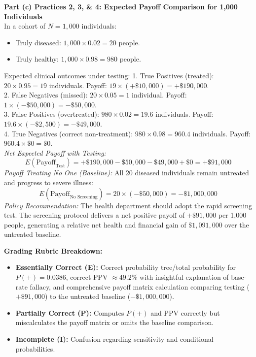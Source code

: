 \begin{frqrubricbox}
\textbf{Part (c) Practices 2, 3, \& 4: Expected Payoff Comparison for 1,000 Individuals}\\
In a cohort of $N = 1,000$ individuals:
\begin{itemize}
  \item Truly diseased: $1,000 \times 0.02 = 20$ people.
  \item Truly healthy: $1,000 \times 0.98 = 980$ people.
\end{itemize}
Expected clinical outcomes under testing:
1. True Positives (treated): $20 \times 0.95 = 19$ individuals. Payoff: $19 \times (+\$10,000) = +\$190,000$.\\
2. False Negatives (missed): $20 \times 0.05 = 1$ individual. Payoff: $1 \times (-\$50,000) = -\$50,000$.\\
3. False Positives (overtreated): $980 \times 0.02 = 19.6$ individuals. Payoff: $19.6 \times (-\$2,500) = -\$49,000$.\\
4. True Negatives (correct non-treatment): $980 \times 0.98 = 960.4$ individuals. Payoff: $960.4 \times \$0 = \$0$.\\
\textit{Net Expected Payoff with Testing:}
\[ E(\text{Payoff}_{\text{Test}}) = +\$190,000 - \$50,000 - \$49,000 + \$0 = +\$91,000 \]
\textit{Payoff Treating No One (Baseline):}
All 20 diseased individuals remain untreated and progress to severe illness:
\[ E(\text{Payoff}_{\text{No Screening}}) = 20 \times (-\$50,000) = -\$1,000,000 \]
\textit{Policy Recommendation:} The health department should adopt the rapid screening test. The screening protocol delivers a net positive payoff of $+\$91,000$ per 1,000 people, generating a relative net health and financial gain of $\$1,091,000$ over the untreated baseline.

\textbf{Grading Rubric Breakdown:}\\
\begin{itemize}
  \item \textbf{Essentially Correct (E):} Correct probability tree/total probability for $P(+) = 0.0386$, correct PPV $\approx 49.2\%$ with insightful explanation of base-rate fallacy, and comprehensive payoff matrix calculation comparing testing ($+\$91,000$) to the untreated baseline ($-\$1,000,000$).
  \item \textbf{Partially Correct (P):} Computes $P(+)$ and PPV correctly but miscalculates the payoff matrix or omits the baseline comparison.
  \item \textbf{Incomplete (I):} Confusion regarding sensitivity and conditional probabilities.
\end{itemize}
\end{frqrubricbox}
